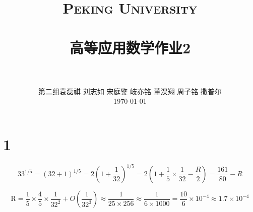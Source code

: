 \documentclass[12pt]{article}
\title{
		\vspace{-1in} 	
		\usefont{OT1}{bch}{b}{n}
		\normalfont \normalsize \textsc{\LARGE Peking University}\\[1cm] %
		\horrule{0.5pt} \\[0.5cm]
		\huge \bfseries{高等应用数学作业2} \\
		\horrule{2pt} \\[0.5cm]
}
\author{
		\normalfont 								\normalsize
		第二组\quad 袁磊祺 \quad 刘志如 \quad 宋庭鉴 \quad 岐亦铭 \quad 董淏翔 \quad 周子铭 \quad 撒普尔\\	\normalsize
        \today
}
\date{}
\begin{document}


\maketitle

\section{1}

\begin{equation}
	33^{1 / 5}=(32+1)^{1 / 5}=2\left(1+\frac{1}{32}\right)^{1 / 5}=2\left(1+\frac{1}{5} \times \frac{1}{32}-\frac{R}{2}\right)=\frac{161}{80}-R
\end{equation}

\begin{equation}
	\mathrm{R}=\frac{1}{5} \times \frac{4}{5} \times \frac{1}{32^{2}}+O\left(\frac{1}{32^{3}}\right) \approx \frac{1}{25 \times 256} \approx \frac{1}{6 \times 1000}=\frac{10}{6} \times 10^{-4} \approx 1.7 \times 10^{-4}
\end{equation}

\nocite{*}


\end{document}
